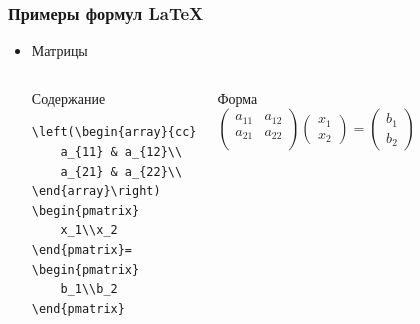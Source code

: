 \begin{frame}[fragile]
\frametitle{Примеры формул \LaTeX}
\begin{itemize}

\item Матрицы
    \begin{columns}
            \begin{block}{Содержание}
\begin{verbatim}
\left(\begin{array}{cc}
    a_{11} & a_{12}\\
    a_{21} & a_{22}\\
\end{array}\right)
\begin{pmatrix}
    x_1\\x_2
\end{pmatrix}=
\begin{pmatrix}
    b_1\\b_2
\end{pmatrix}
\end{verbatim}
            \end{block}
        
            \begin{block}{Форма}
\[
\left(\begin{array}{cc}
a_{11} & a_{12}\\
a_{21} & a_{22}\\
\end{array}\right)
\begin{pmatrix}x_1\\x_2\end{pmatrix}=
\begin{pmatrix}b_1\\b_2\end{pmatrix}
\]
            \end{block}
    \end{columns}
    
\end{itemize}
\end{frame}



